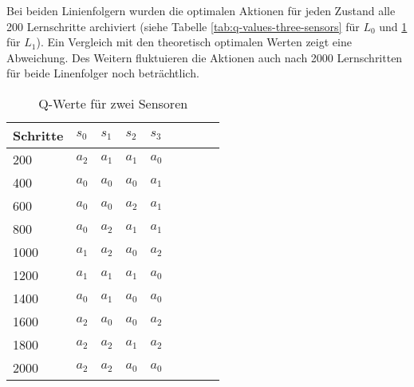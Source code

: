 Bei beiden Linienfolgern wurden die optimalen Aktionen für jeden Zustand alle 200 Lernschritte archiviert (siehe Tabelle \ref{tab:q-values-three-sensors} für $L_0$ und \ref{tab:q-values-two-sensors} für $L_1$). Ein Vergleich mit den theoretisch optimalen Werten zeigt eine Abweichung. Des Weitern fluktuieren die Aktionen auch nach 2000 Lernschritten für beide Linenfolger noch beträchtlich.

\begin{table}[h]
  \caption{Q-Werte für zwei Sensoren}
  \label{tab:q-values-two-sensors}
  \renewcommand{\arraystretch}{1.2}
  \centering
  \sffamily
  \begin{footnotesize}
    \begin{tabular}{l l l l l l l l l}
    \toprule
    \textbf{Schritte} & \textbf{$s_0$} & \textbf{$s_1$} & \textbf{$s_2$} & \textbf{$s_3$}\\
    \midrule
    200     &       $a_2$   &       $a_1$   &       $a_1$   &       $a_0$\\
    400  &       $a_0$   &       $a_0$   &       $a_0$   &       $a_1$\\
    600  &       $a_0$   &       $a_0$   &       $a_2$       &       $a_1$\\
    800  &       $a_0$   &       $a_2$   &       $a_1$   &       $a_1$\\
    1000 &       $a_1$   &       $a_2$   &       $a_0$   &       $a_2$\\
    1200 &       $a_1$   &  $a_1$    &       $a_1$   &       $a_0$\\
    1400 &       $a_0$   &       $a_1$   &       $a_0$   &       $a_0$\\
    1600 &       $a_2$   &       $a_0$   &       $a_0$   &       $a_2$\\
    1800 &  $a_2$    &       $a_2$   &       $a_1$   &       $a_2$\\
    2000 &       $a_2$   &       $a_2$   &       $a_0$   &       $a_0$\\
    \bottomrule
    \end{tabular}
  \end{footnotesize}
  \rmfamily
\end{table}

